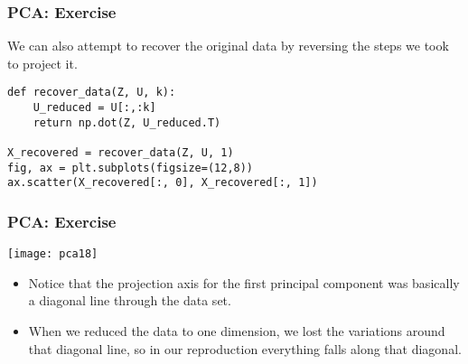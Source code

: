 \begin{frame}[fragile]\frametitle{PCA: Exercise}
We can also attempt to recover the original data by reversing the steps we took to project it.
\begin{lstlisting}
def recover_data(Z, U, k):
    U_reduced = U[:,:k]
    return np.dot(Z, U_reduced.T)
    
X_recovered = recover_data(Z, U, 1)
fig, ax = plt.subplots(figsize=(12,8))
ax.scatter(X_recovered[:, 0], X_recovered[:, 1])
\end{lstlisting}
\end{frame}

\begin{frame}[fragile]\frametitle{PCA: Exercise}
\begin{center}
\texttt{[image: pca18]}
\end{center}
\begin{itemize}
\item Notice that the projection axis for the first principal component was basically a diagonal line through the data set. 
\item When we reduced the data to one dimension, we lost the variations around that diagonal line, so in our reproduction everything falls along that diagonal.
\end{itemize}
\end{frame}

